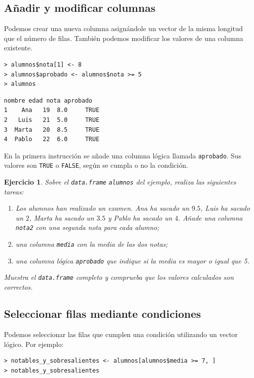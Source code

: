 \documentclass[11pt,a4paper]{article}
\theoremstyle{exercise}
\newtheorem{exercise}{Ejercicio}
\begin{document}
\subsection{Añadir y modificar columnas}

Podemos crear una nueva columna asignándole un vector de la misma longitud que el número de filas. También podemos modificar los valores de una columna existente.

\begin{lstlisting}[style=rstyle]
> alumnos$nota[1] <- 8
> alumnos$aprobado <- alumnos$nota >= 5
> alumnos
\end{lstlisting}
\begin{lstlisting}[style=routput]
  nombre edad nota aprobado
1    Ana   19  8.0     TRUE
2   Luis   21  5.0     TRUE
3  Marta   20  8.5     TRUE
4  Pablo   22  6.0     TRUE
\end{lstlisting}

En la primera instrucción se añade una columna lógica llamada \texttt{aprobado}. Sus valores son \texttt{TRUE} o \texttt{FALSE}, según se cumpla o no la condición.

\begin{exercise}
Sobre el \texttt{data.frame} \texttt{alumnos} del ejemplo, realiza las siguientes tareas:
\begin{enumerate}
    \item Los alumnos han realizado un examen. Ana ha sacado un $9.5$, Luis ha sacado un $2$, Marta ha sacado un $3.5$ y Pablo ha sacado un $4$. Añade una columna \texttt{nota2} con una segunda nota para cada alumno;
    \item una columna \texttt{media} con la media de las dos notas;
    \item una columna lógica \texttt{aprobado} que indique si la media es mayor o igual que 5.
\end{enumerate}
Muestra el \texttt{data.frame} completo y comprueba que los valores calculados son correctos.
\end{exercise}

\subsection{Seleccionar filas mediante condiciones}

Podemos seleccionar las filas que cumplen una condición utilizando un vector lógico. Por ejemplo:

\begin{lstlisting}[style=rconsole]
> notables_y_sobresalientes <- alumnos[alumnos$media >= 7, ]
> notables_y_sobresalientes
\end{lstlisting}
\end{document}
